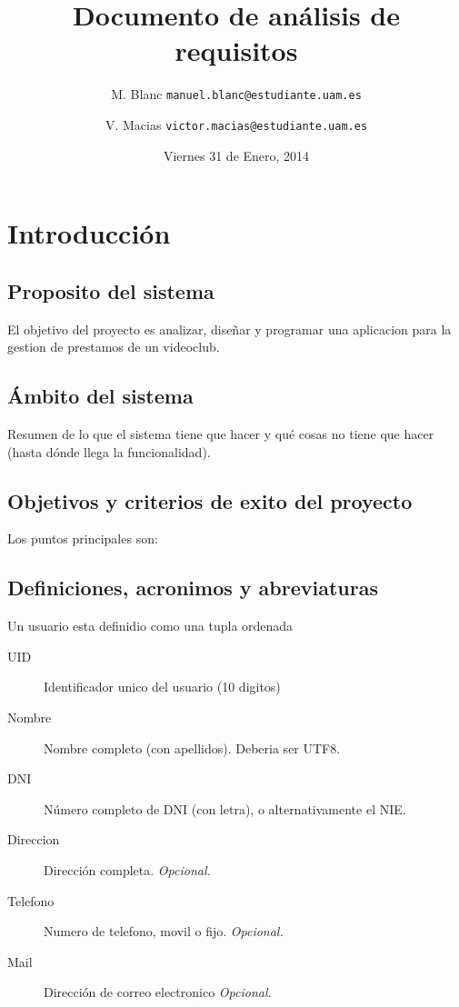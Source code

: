 \documentclass[11pt]{article}
\title{Documento de análisis de requisitos}
\author{M. Blanc \texttt{manuel.blanc@estudiante.uam.es} \and V. Macias \texttt{victor.macias@estudiante.uam.es}}
\date{Viernes 31 de Enero, 2014}
\begin{document}
\clearpage\maketitle
\thispagestyle{empty}
\tableofcontents

\section{Introducción}
\subsection{Proposito del sistema}
El objetivo del proyecto es analizar, diseñar y programar una aplicacion para la gestion de prestamos de un videoclub.

\subsection{Ámbito del sistema}
Resumen de lo que el sistema tiene que hacer y qué cosas no tiene que hacer (hasta dónde llega la funcionalidad).

\subsection{Objetivos y criterios de exito del proyecto}
Los puntos principales son:


\subsection{Definiciones, acronimos y abreviaturas}
Un usuario esta definidio como una tupla ordenada
\begin{description}
	\item[UID]      		Identificador unico del usuario (10 digitos)
	\item[Nombre]   		Nombre completo (con apellidos). Deberia ser UTF8.
	\item[DNI]      		Número completo de DNI (con letra), o alternativamente el NIE.
	\item[Direccion]	Dirección completa. \textit{Opcional.}
	\item[Telefono] 		Numero de telefono, movil o fijo. \textit{Opcional.}
	\item[Mail]     		Dirección de correo electronico \textit{Opcional.}
\end{description}
\end{document}
